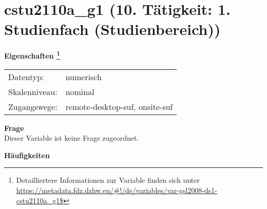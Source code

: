 
    \setcounter{footnote}{0}

    \vspace*{-1.8cm}
	\section{cstu2110a\_g1 (10. Tätigkeit: 1. Studienfach (Studienbereich))}
	\label{section:cstu2110a_g1}



    \vspace*{0.5cm}
    \noindent\textbf{Eigenschaften
	\footnote{Detailliertere Informationen zur Variable finden sich unter
		\url{https://metadata.fdz.dzhw.eu/\#!/de/variables/var-gsl2008-ds1-cstu2110a_g1$}}}\\
	\begin{tabularx}{\hsize}{@{}lX}
	Datentyp: & numerisch \\
	Skalenniveau: & nominal \\
	Zugangswege: &
	  remote-desktop-suf, 
	  onsite-suf
 \\
    \end{tabularx}



		\vspace*{0.5cm}
		\noindent\textbf{Frage}\\
		Dieser Variable ist keine Frage zugeordnet.





        		\vspace*{0.5cm}
                \noindent\textbf{Häufigkeiten}

